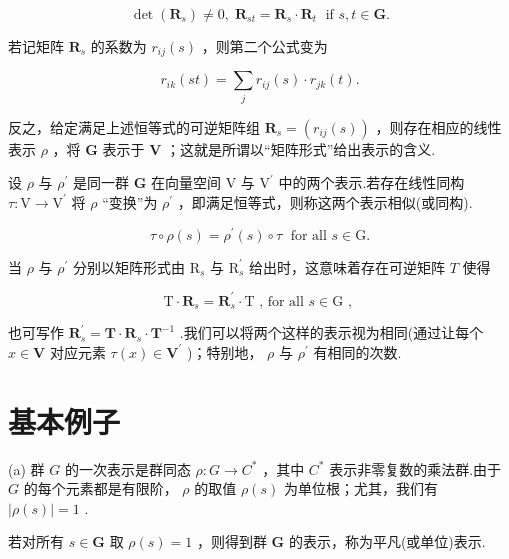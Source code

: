 \[
\det \left( {\mathbf{R}}_{s}\right)  \neq  0,\;{\mathbf{R}}_{st} = {\mathbf{R}}_{s} \cdot  {\mathbf{R}}_{t}\;\text{ if }s,t \in  \mathbf{G}.
\]

若记矩阵 \({\mathbf{R}}_{s}\) 的系数为 \({r}_{ij}\left( s\right)\) ，则第二个公式变为

\[
{r}_{ik}\left( {st}\right)  = \mathop{\sum }\limits_{j}{r}_{ij}\left( s\right)  \cdot  {r}_{jk}\left( t\right) .
\]

反之，给定满足上述恒等式的可逆矩阵组 \({\mathbf{R}}_{s} = \left( {{r}_{ij}\left( s\right) }\right)\) ，则存在相应的线性表示 \(\rho\) ，将 \(\mathbf{G}\) 表示于 \(\mathbf{V}\) ；这就是所谓以“矩阵形式”给出表示的含义.

设 \(\rho\) 与 \({\rho }^{\prime }\) 是同一群 \(\mathbf{G}\) 在向量空间 \(\mathrm{V}\) 与 \({\mathrm{V}}^{\prime }\) 中的两个表示.若存在线性同构 \(\tau  : \mathrm{V} \rightarrow  {\mathrm{V}}^{\prime }\) 将 \(\rho\) “变换”为 \({\rho }^{\prime }\) ，即满足恒等式，则称这两个表示相似(或同构).

\[
\tau  \circ  \rho \left( s\right)  = {\rho }^{\prime }\left( s\right)  \circ  \tau \;\text{ for all }s \in  \mathrm{G}.
\]

当 \(\rho\) 与 \({\rho }^{\prime }\) 分别以矩阵形式由 \({\mathrm{R}}_{s}\) 与 \({\mathrm{R}}_{s}^{\prime }\) 给出时，这意味着存在可逆矩阵 \(T\) 使得

\[
\mathrm{T} \cdot  {\mathbf{R}}_{s} = {\mathbf{R}}_{s}^{\prime } \cdot  \mathrm{T}\text{ , for all }s \in  \mathrm{G}\text{ , }
\]

也可写作 \({\mathbf{R}}_{s}^{\prime } = \mathbf{T} \cdot  {\mathbf{R}}_{s} \cdot  {\mathbf{T}}^{-1}\) .我们可以将两个这样的表示视为相同(通过让每个 \(x \in  \mathbf{V}\) 对应元素 \(\tau \left( x\right)  \in  {\mathbf{V}}^{\prime }\) )；特别地， \(\rho\) 与 \({\rho }^{\prime }\) 有相同的次数.

\section{基本例子}

(a) 群 \(G\) 的一次表示是群同态 \(\rho  : G \rightarrow  {C}^{ * }\) ，其中 \({C}^{ * }\) 表示非零复数的乘法群.由于 \(G\) 的每个元素都是有限阶， \(\rho\) 的取值 \(\rho \left( s\right)\) 为单位根；尤其，我们有 \(\left| {\rho \left( s\right) }\right|  = 1\) .

若对所有 \(s \in  \mathbf{G}\) 取 \(\rho \left( s\right)  = 1\) ，则得到群 \(\mathbf{G}\) 的表示，称为平凡(或单位)表示.

